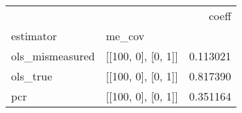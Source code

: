 \begin{tabular}{llr}
\toprule
    &                    &     coeff \\
estimator & me\_cov &           \\
\midrule
ols\_mismeasured & [[100, 0], [0, 1]] &  0.113021 \\
ols\_true & [[100, 0], [0, 1]] &  0.817390 \\
pcr & [[100, 0], [0, 1]] &  0.351164 \\
\bottomrule
\end{tabular}
